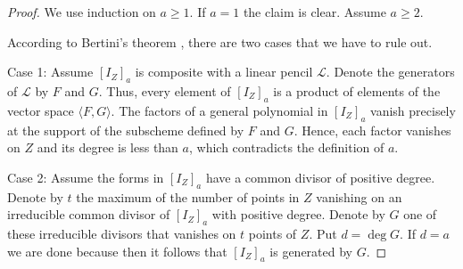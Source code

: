\documentclass[12pt]{amsart}%
\numberwithin{equation}{section}
\theoremstyle{definition}
\numberwithin{equation}{section}
\begin{document}
\begin{proof}
We use induction on $a \ge 1$. If $a = 1$ the claim is clear. Assume $a \ge 2$.


 According to Bertini's theorem \cite[Theorems 5.1, 5.2]{kleiman}, there are two cases that we have to rule out. 
 
Case 1: Assume $[I_Z]_a$ is composite with a linear pencil $\mathcal{L}$. Denote the generators of $\mathcal{L}$ by $F$ and $G$. Thus, every element of $[I_Z]_a$ is a product of elements of the vector space $\langle F,G \rangle$. The factors of a general polynomial in $[I_Z]_a$ vanish precisely at the support of the subscheme defined by $F$ and $G$. Hence, each factor vanishes on $Z$ and its degree is less than $a$, which contradicts the definition of $a$. 



Case 2: Assume the forms in $[I_Z]_a$ have a common divisor of positive degree. Denote by $t$ the maximum of the number of points in $Z$ vanishing on an irreducible common divisor of $[I_Z]_a$ with positive degree. Denote by $G$ one of these irreducible divisors that vanishes on $t$ points of $Z$. Put $d = \deg G$. If $d = a$ we are done because then it follows that $[I_Z]_a$ is generated by $G$. 


\end{proof}
\end{document}
